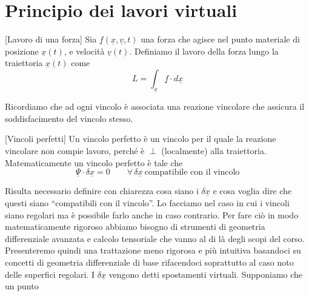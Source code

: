 \chapter{Principio dei lavori virtuali}
\begin{definition}{}[Lavoro di una forza]
Sia \(\underline{f}(\underline{x},\underline{v},t)\) una forza che agisce nel punto materiale di posizione \(\underline{x}(t)\), e velocità \(\underline{v}(t)\). Definiamo il lavoro della forza lungo la traiettoria \(\underline{x}(t)\) come
\[
L=\int_{\underline{x}} \underline{f}\cdot d\underline{x}
\]

\begin{center}
\end{center}
\end{definition}
Ricordiamo che ad ogni vincolo è associata una reazione vincolare che assicura il soddisfacimento del vincolo stesso.

\begin{definition}{}[Vincoli perfetti]
Un vincolo perfetto è un vincolo per il quale la reazione vincolare non compie lavoro, perché è \(\perp\) (localmente) alla traiettoria. Matematicamente un vincolo perfetto è tale che
\[
\underline{\Psi}\cdot \delta \underline{x}=0
\qquad
\forall\, \delta \underline{x}\ \text{compatibile con il vincolo}
\]
\end{definition}


Risulta necessario definire con chiarezza cosa siano i \(\delta \underline{x}\) e cosa voglia dire che questi siano ``compatibili con il vincolo''.
Lo facciamo nel caso in cui i vincoli siano regolari ma è possibile farlo anche in caso contrario.
Per fare ciò in modo matematicamente rigoroso abbiamo bisogno di strumenti di geometria differenziale avanzata e calcolo tensoriale che vanno al di là degli scopi del corso. Presenteremo quindi una trattazione meno rigorosa e più intuitiva basandoci su concetti di geometria differenziale di base rifacendoci soprattutto al caso noto delle superfici regolari.
\inizioapprof
I \(\delta \underline{x}\) vengono detti spostamenti virtuali. Supponiamo che un punto

